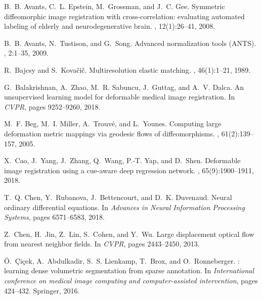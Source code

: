 \documentclass{article}
\numberwithin{equation}{section}
\begin{document}
{\small

\begin{thebibliography}{10}

B.~B. Avants, C.~L. Epstein, M.~Grossman, and J.~C. Gee.
\newblock Symmetric diffeomorphic image registration with cross-correlation:
  evaluating automated labeling of elderly and neurodegenerative brain.
, 12(1):26--41, 2008.

B.~B. Avants, N.~Tustison, and G.~Song.
\newblock Advanced normalization tools {(ANTS)}.
, 2:1--35, 2009.

R.~Bajcsy and S.~Kova{\v{c}}i{\v{c}}.
\newblock Multiresolution elastic matching.
, 46(1):1--21, 1989.

G.~Balakrishnan, A.~Zhao, M.~R. Sabuncu, J.~Guttag, and A.~V. Dalca.
\newblock An unsupervised learning model for deformable medical image
  registration.
\newblock In {\em CVPR}, pages 9252--9260, 2018.

M.~F. Beg, M.~I. Miller, A.~Trouv{\'e}, and L.~Younes.
\newblock Computing large deformation metric mappings via geodesic flows of
  diffeomorphisms.
, 61(2):139--157, 2005.

X.~Cao, J.~Yang, J.~Zhang, Q.~Wang, P.-T. Yap, and D.~Shen.
\newblock Deformable image registration using a cue-aware deep regression
  network.
, 65(9):1900--1911,
  2018.

T.~Q. Chen, Y.~Rubanova, J.~Bettencourt, and D.~K. Duvenaud.
\newblock Neural ordinary differential equations.
\newblock In {\em Advances in Neural Information Processing Systems}, pages
  6571--6583, 2018.

Z.~Chen, H.~Jin, Z.~Lin, S.~Cohen, and Y.~Wu.
\newblock Large displacement optical flow from nearest neighbor fields.
\newblock In {\em CVPR}, pages 2443--2450, 2013.

{\"O}.~{\c{C}}i{\c{c}}ek, A.~Abdulkadir, S.~S. Lienkamp, T.~Brox, and
  O.~Ronneberger.
: learning dense volumetric segmentation from sparse
  annotation.
\newblock In {\em International conference on medical image computing and
  computer-assisted intervention}, pages 424--432. Springer, 2016.


\end{thebibliography}}
\end{document}

